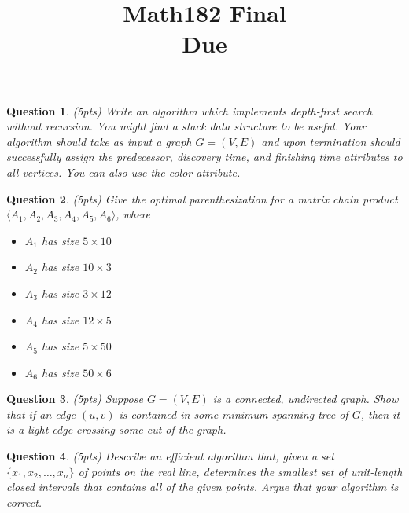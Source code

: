 \documentclass[11pt]{amsart}
\title{Math182 Final %
\\ Due \duedate}
\theoremstyle{theorem}
\newtheorem{question}{Question}
\begin{document}
\maketitle


\begin{question}
(5pts) Write an algorithm which implements depth-first search without recursion. You might find a \emph{stack} data structure to be useful. Your algorithm should take as input a graph $G=(V,E)$ and upon termination should successfully assign the \emph{predecessor}, \emph{discovery time}, and \emph{finishing time} attributes to all vertices. You can also use the \emph{color} attribute.
\end{question}

\begin{question}
(5pts) Give the optimal parenthesization for a matrix chain product $\langle A_1,A_2,A_3,A_4, A_5, A_6\rangle$, where
\begin{itemize}
\item $A_1$ has size $5\times 10$
\item $A_2$ has size $10\times 3$
\item $A_3$ has size $3\times 12$
\item $A_4$ has size $12\times 5$
\item $A_5$ has size $5\times 50$
\item $A_6$ has size $50\times 6$
\end{itemize}
\end{question}

\begin{question}
(5pts) Suppose $G=(V,E)$ is a connected, undirected graph. Show that if an edge $(u,v)$ is contained in some minimum spanning tree of $G$, then it is a light edge crossing some cut of the graph.
\end{question}

\begin{question}
(5pts) Describe an efficient algorithm that, given a set $\{x_1,x_2,\ldots,x_n\}$ of points on the real line, determines the smallest set of unit-length closed intervals that contains all of the given points. Argue that your algorithm is correct.
\end{question}
\end{document}
